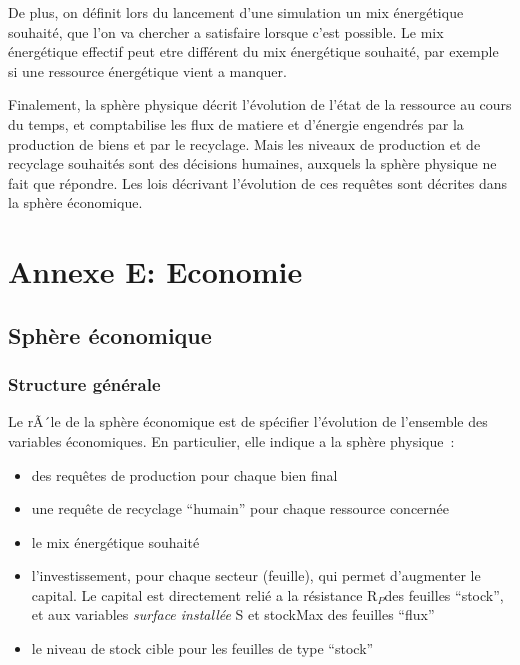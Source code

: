\documentclass[12pt,a4paper]{article}%
\begin{document}
De plus, on définit lors du lancement d'une simulation un mix énergétique
souhaité, que l'on va chercher a satisfaire lorsque c'est possible. Le mix
énergétique effectif peut etre différent du mix énergétique souhaité, par
exemple si une ressource énergétique vient a manquer.

Finalement, la sphère physique décrit l'évolution de l'état de la
ressource au cours du temps, et comptabilise les flux de matiere et d'énergie
engendrés par la production de biens et par le recyclage. Mais les niveaux de
production et de recyclage souhaités sont des décisions humaines, auxquels la
sphère physique ne fait que répondre. Les lois décrivant l'évolution de
ces requêtes sont décrites dans la sphère économique.

\section{\textbf{{Annexe E: Economie}}}

\subsection{{S}phère économique}

\subsubsection{{Structure générale}}

Le rÃ´le de la sphère économique est de spécifier l'évolution de l'ensemble
des variables économiques. En particulier, elle indique a la sphère physique~:

\begin{itemize}
\item des requêtes de production pour chaque bien final

\item une requête de recyclage ``humain'' pour chaque ressource concernée

\item le mix énergétique souhaité

\item l'investissement, pour chaque secteur (feuille), qui permet d'augmenter
le capital. Le capital est directement relié a la résistance R$_{P}$des
feuilles ``stock'', et aux variables \textit{surface installée} S et stockMax
des feuilles ``flux''

\item le niveau de stock cible pour les feuilles de type ``stock''
\end{itemize}
\end{document}
